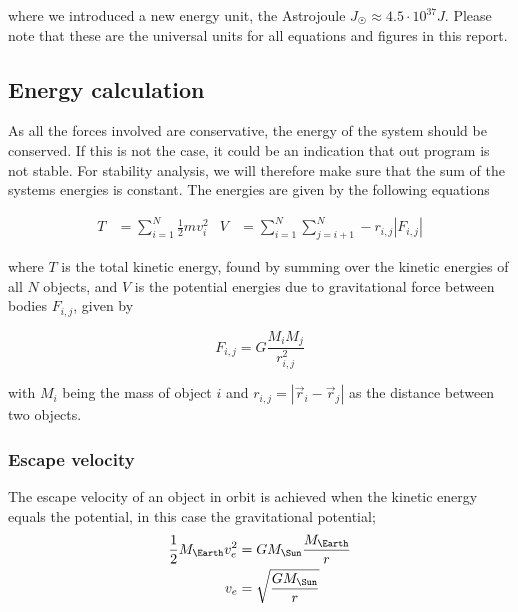 \documentclass[10pt]{article}
\begin{document}
\begin{multicols}{2}
where we introduced a new energy unit, the Astrojoule $J_\Sun \approx 4.5\cdot10^{37}J  $.  Please note
that these are the universal units for all equations and figures in this
report.


\subsection{Energy calculation}
As all the forces involved are conservative, the energy of the system
should be conserved. If this is not the case, it could be an indication
that out program is not stable. For stability analysis, we will therefore
make sure that the sum of the systems energies is constant. The energies
are given by the following equations 

\begin{align}\label{eq:energies}
    T &= \sum_{i=1}^N \frac{1}{2}mv_i^2 & V &= \sum_{i=1}^N \sum_{j=i+1}^N
    -r_{i,j}|F_{i,j}|
\end{align}

where $T$ is the total kinetic energy, found by summing over the kinetic
energies of all $N$ objects, and $V$ is the potential energies due to
gravitational force between bodies $F_{i,j}$, given by

\begin{equation}
    F_{i,j} =  G\frac{M_iM_j}{r_{i,j}^2}
\end{equation}

with $M_i$ being the mass of object $i$ and $r_{i,j} = |\vec r_i - \vec
r_j|$ as the distance between two objects.

\subsubsection{Escape velocity}
The escape velocity of an object in orbit is achieved when the kinetic energy equals the potential, in this case the gravitational potential;
\begin{align}
    \frac{1}{2}M_\Earth v_e^2 &= GM_\Sun\frac{M_\Earth}{r}\nonumber\\
    v_e &= \sqrt{ \frac{GM_\Sun }{r} }
\end{align}



\end{multicols}
\end{document}
